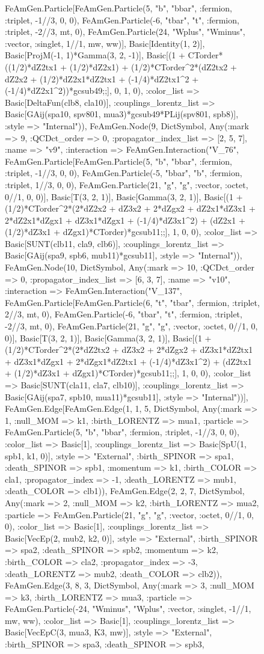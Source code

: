 \documentclass{revtex4}
\begin{document}
\begin{figure}[!htb]
\begin{center}
{FeAmGen.Particle[FeAmGen.Particle(5, "b", "bbar", :fermion, :triplet, -1//3, 0, 0), FeAmGen.Particle(-6, "tbar", "t", :fermion, :triplet, -2//3, mt, 0), FeAmGen.Particle(24, "Wplus", "Wminus", :vector, :singlet, 1//1, mw, ww)], Basic[Identity(1, 2)], Basic[ProjM(-1, 1)*Gamma(3, 2, -1)], Basic[(1 + CTorder*((1/2)*dZ2tx1 + (1/2)*dZ2x1) + (1/2)*CTorder^2*(dZ2tx2 + dZ2x2 + (1/2)*dZ2x1*dZ2tx1 + (-1/4)*dZ2tx1^2 + (-1/4)*dZ2x1^2))*gcsub49;;], 0, 1, 0), :color_list => Basic[DeltaFun(clb8, cla10)], :couplings_lorentz_list => Basic[GAij(spa10, spv801, mua3)*gcsub49*PLij(spv801, spb8)], :style => "Internal")), FeAmGen.Node(9, Dict{Symbol, Any}(:mark => 9, :QCDct_order => 0, :propagator_index_list => [2, 5, 7], :name => "v9", :interaction => FeAmGen.Interaction("V_76", FeAmGen.Particle[FeAmGen.Particle(5, "b", "bbar", :fermion, :triplet, -1//3, 0, 0), FeAmGen.Particle(-5, "bbar", "b", :fermion, :triplet, 1//3, 0, 0), FeAmGen.Particle(21, "g", "g", :vector, :octet, 0//1, 0, 0)], Basic[T(3, 2, 1)], Basic[Gamma(3, 2, 1)], Basic[(1 + (1/2)*CTorder^2*(2*dZ2x2 + dZ3x2 + 2*dZgx2 + dZ2x1*dZ3x1 + 2*dZ2x1*dZgx1 + dZ3x1*dZgx1 + (-1/4)*dZ3x1^2) + (dZ2x1 + (1/2)*dZ3x1 + dZgx1)*CTorder)*gcsub11;;], 1, 0, 0), :color_list => Basic[SUNT(clb11, cla9, clb6)], :couplings_lorentz_list => Basic[GAij(spa9, spb6, mub11)*gcsub11], :style => "Internal")), FeAmGen.Node(10, Dict{Symbol, Any}(:mark => 10, :QCDct_order => 0, :propagator_index_list => [6, 3, 7], :name => "v10", :interaction => FeAmGen.Interaction("V_137", FeAmGen.Particle[FeAmGen.Particle(6, "t", "tbar", :fermion, :triplet, 2//3, mt, 0), FeAmGen.Particle(-6, "tbar", "t", :fermion, :triplet, -2//3, mt, 0), FeAmGen.Particle(21, "g", "g", :vector, :octet, 0//1, 0, 0)], Basic[T(3, 2, 1)], Basic[Gamma(3, 2, 1)], Basic[(1 + (1/2)*CTorder^2*(2*dZ2tx2 + dZ3x2 + 2*dZgx2 + dZ3x1*dZ2tx1 + dZ3x1*dZgx1 + 2*dZgx1*dZ2tx1 + (-1/4)*dZ3x1^2) + (dZ2tx1 + (1/2)*dZ3x1 + dZgx1)*CTorder)*gcsub11;;], 1, 0, 0), :color_list => Basic[SUNT(cla11, cla7, clb10)], :couplings_lorentz_list => Basic[GAij(spa7, spb10, mua11)*gcsub11], :style => "Internal"))], FeAmGen.Edge[FeAmGen.Edge(1, 1, 5, Dict{Symbol, Any}(:mark => 1, :null_MOM => k1, :birth_LORENTZ => mua1, :particle => FeAmGen.Particle(5, "b", "bbar", :fermion, :triplet, -1//3, 0, 0), :color_list => Basic[1], :couplings_lorentz_list => Basic[SpU(1, spb1, k1, 0)], :style => "External", :birth_SPINOR => spa1, :death_SPINOR => spb1, :momentum => k1, :birth_COLOR => cla1, :propagator_index => -1, :death_LORENTZ => mub1, :death_COLOR => clb1)), FeAmGen.Edge(2, 2, 7, Dict{Symbol, Any}(:mark => 2, :null_MOM => k2, :birth_LORENTZ => mua2, :particle => FeAmGen.Particle(21, "g", "g", :vector, :octet, 0//1, 0, 0), :color_list => Basic[1], :couplings_lorentz_list => Basic[VecEp(2, mub2, k2, 0)], :style => "External", :birth_SPINOR => spa2, :death_SPINOR => spb2, :momentum => k2, :birth_COLOR => cla2, :propagator_index => -3, :death_LORENTZ => mub2, :death_COLOR => clb2)), FeAmGen.Edge(3, 8, 3, Dict{Symbol, Any}(:mark => 3, :null_MOM => k3, :birth_LORENTZ => mua3, :particle => FeAmGen.Particle(-24, "Wminus", "Wplus", :vector, :singlet, -1//1, mw, ww), :color_list => Basic[1], :couplings_lorentz_list => Basic[VecEpC(3, mua3, K3, mw)], :style => "External", :birth_SPINOR => spa3, :death_SPINOR => spb3, }
\end{center}
\end{figure}
\end{document}
